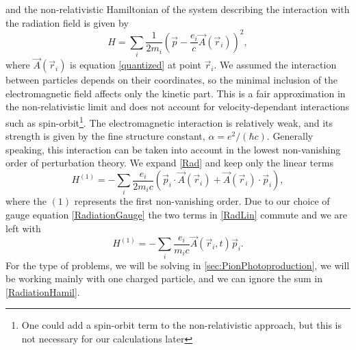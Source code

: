 and the non-relativistic Hamiltonian of the system describing the interaction with the radiation field is given by
\begin{equation} \label{Rad}
	H = \sum_i \frac{1}{2m_i}\left( \vec{p}-\frac{e_i}{c}\vec{A}(\vec{r}_i)\right)^2,
\end{equation}
where $\vec{A}(\vec{r}_i)$ is equation \eqref{quantized} at point $\vec{r}_i$. We assumed the interaction between particles depends on their coordinates, so the minimal inclusion of the electromagnetic field affects only the kinetic part. This is a fair approximation in the non-relativistic limit and does not account for velocity-dependant interactions such as spin-orbit\footnote{One could add a spin-orbit term to the non-relativistic approach, but this is not necessary for our calculations later}. 
The electromagnetic interaction is relatively weak, and its strength is given by the fine structure constant, $\alpha = e^2/(\hbar c)$. Generally speaking, this interaction can be taken into account in the lowest non-vanishing order of perturbation theory. We expand \eqref{Rad} and keep only the linear terms
\begin{equation} \label{RadLin}
	H^{(1)} = -\sum_i \frac{e_i}{2m_i c} (\vec{p}_i\cdot \vec{A}(\vec{r}_i)+\vec{A}(\vec{r}_i)\cdot \vec{p}_i),
\end{equation}
where the $(1)$ represents the first non-vanishing order. Due to our choice of gauge equation \eqref{RadiationGauge} the two terms in \eqref{RadLin} commute and we are left with
\begin{equation} \label{RadiationHamil}
	H^{(1)} = - \sum_i \frac{e_i}{m_i c} \vec{A}(\vec{r}_i,t)\vec{p}_i.
\end{equation}
For the type of problems, we will be solving in \ref{sec:PionPhotoproduction}, we will be working mainly with one charged particle, and we can ignore the sum in \eqref{RadiationHamil}.
